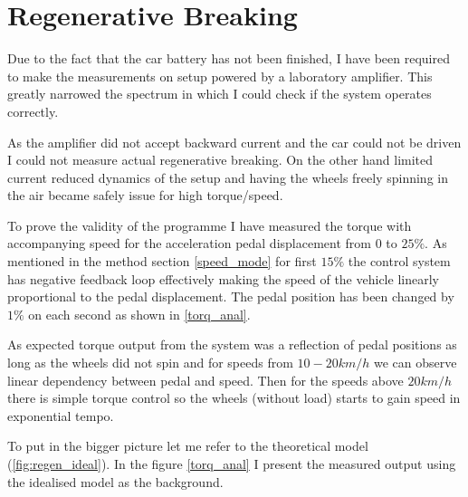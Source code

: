 \section{Regenerative Breaking}
Due to the fact that the car battery has not been finished, I have been required to make the measurements on setup powered by a laboratory amplifier. This greatly narrowed the spectrum in which I could check if the system operates correctly.

As the amplifier did not accept backward current and the car could not be driven I could not measure actual regenerative breaking. On the other hand limited current reduced dynamics of the setup and having the wheels freely spinning in the air became safely issue for high torque/speed.

To prove the validity of the programme I have measured the torque with accompanying speed for the acceleration pedal displacement from $0$ to $25\%$. As mentioned in the method section \ref{speed_mode} for first $15\%$  the control system has negative feedback loop effectively making the speed of the vehicle linearly proportional to the pedal displacement.
The pedal position has been changed by $1\%$ on each second as shown in \ref{torq_anal}. 


As expected torque output from the system was a reflection of pedal positions as long as the wheels did not spin and for speeds from $10-20 km/h$ we can observe linear dependency between pedal and speed. Then for the speeds above $20km/h$ there is simple torque control so the wheels (without load) starts to gain speed in exponential tempo.

To put in the bigger picture let me refer to the theoretical model (\ref{fig:regen_ideal}). In the figure \ref{torq_anal} I present the measured output using the idealised model as the background. 


